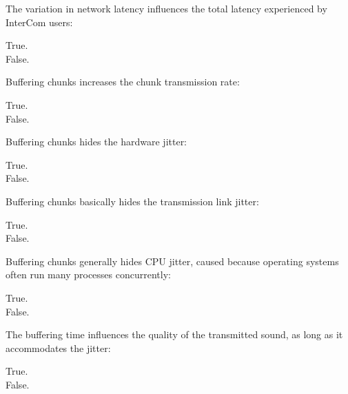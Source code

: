 \documentclass[legalpaper, 12pt, addpoints]{exam}
\begin{document}
\begin{questions}
\vspace{0.10in}

\question The variation in network latency influences the total latency experienced by InterCom users:

\begin{oneparchoices}
  \choice True.\\
  \choice False.
\end{oneparchoices}

\vspace{0.10in}

\question Buffering chunks increases the chunk transmission rate:

\begin{oneparchoices}
  \choice True.\\
  \choice False.
\end{oneparchoices}

\vspace{0.10in}

\question Buffering chunks hides the hardware jitter:

\begin{oneparchoices}
  \choice True.\\
  \choice False.
\end{oneparchoices}

\vspace{0.10in}

\question Buffering chunks basically hides the transmission link jitter:

\begin{oneparchoices}
  \choice True.\\
  \choice False.
\end{oneparchoices}

\vspace{0.10in}

\question Buffering chunks generally hides CPU jitter, caused because operating systems often run many processes concurrently:

\begin{oneparchoices}
  \choice True.\\
  \choice False.
\end{oneparchoices}

\vspace{0.10in}

\question The buffering time influences the quality of the transmitted sound, as long as it accommodates the jitter:

\begin{oneparchoices}
  \choice True.\\
  \choice False.
\end{oneparchoices}


\end{questions}
\end{document}
